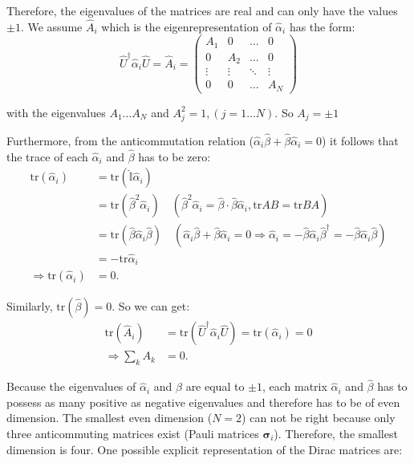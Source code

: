Therefore, the eigenvalues of the matrices are real and can only have the values $\pm 1$. We assume $\hat{A}_i$ which is the eigenrepresentation of $\hat{\alpha}_i$ has the form:
\begin{equation}
\hat{U}^\dagger \hat{\alpha}_i \hat{U} = \hat{A}_i = \begin{pmatrix} A_1 & 0 & \dots & 0 \\ 0 & A_2 & \dots & 0 \\ \vdots & \vdots & \ddots & \vdots \\ 0 & 0 & \dots & A_N \end{pmatrix}
\end{equation}

with the eigenvalues $A_1 \dots A_N$ and $A_j^2 = 1, (j=1 \dots N)$. So $A_j = \pm 1$

Furthermore, from the anticommutation relation ($\hat{\alpha}_i \hat{\beta} + \hat{\beta} \hat{\alpha}_i = 0$)
it follows that the trace of each $\hat{\alpha}_i$ and $\hat{\beta}$ has to be zero:
\begin{equation}
\begin{aligned}
\text{tr}(\hat{\alpha}_i) &= \text{tr}(\hat{\mathbb{I}} \hat{\alpha}_i) \\
&= \text{tr}(\hat{\beta}^2 \hat{\alpha}_i) \quad (\hat{\beta}^2 \hat{\alpha}_i = \hat{\beta} \cdot \hat{\beta} \hat{\alpha}_i, \text{tr} AB = \text{tr} BA) \\
&= \text{tr}(\hat{\beta} \hat{\alpha}_i \hat{\beta}) \quad (\hat{\alpha}_i \hat{\beta} + \hat{\beta} \hat{\alpha}_i = 0 \Rightarrow \hat{\alpha}_i = -\hat{\beta} \hat{\alpha}_i \hat{\beta}^\dagger = -\hat{\beta} \hat{\alpha}_i \hat{\beta}) \\
&= -\text{tr} \hat{\alpha}_i \\
\Rightarrow \text{tr}(\hat{\alpha}_i) &= 0.
\end{aligned}
\end{equation}

Similarly, $\text{tr}(\hat{\beta}) = 0$. So we can get:
\begin{equation}
\begin{aligned}
\text{tr}(\hat{A}_i) &= \text{tr}(\hat{U}^\dagger \hat{\alpha}_i \hat{U}) = \text{tr}(\hat{\alpha}_i) = 0 \\
\Rightarrow \sum_k A_k &= 0.
\end{aligned}
\end{equation}

Because the eigenvalues of $\hat{\alpha}_i$ and $\hat{\beta}$ are equal to $\pm 1$, each matrix $\hat{\alpha}_i$ and $\hat{\beta}$ has to possess as many positive as negative eigenvalues and therefore has to be of even dimension. The smallest even dimension ($N=2$) can not be right because only three anticommuting matrices exist (Pauli matrices $\bm{\sigma}_i$). Therefore, the smallest dimension is four. One possible explicit representation of the Dirac matrices are:

